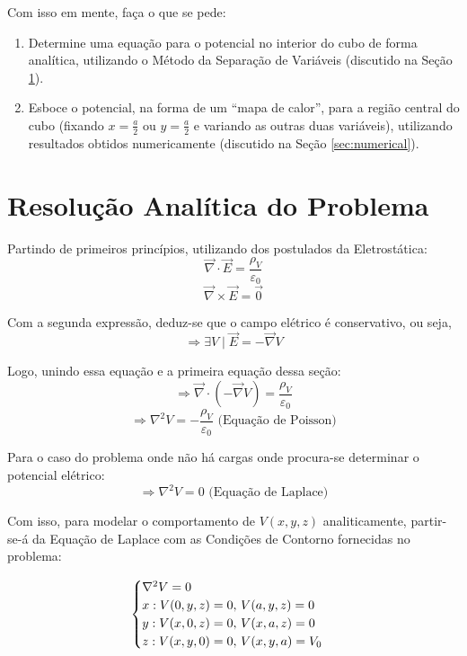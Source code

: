 \documentclass{report}
\let\oldsection\section
\renewcommand\section{\clearpage\oldsection}
\begin{document}
Com isso em mente, faça o que se pede:
\begin{enumerate}
    \item Determine uma equação para o potencial no interior do cubo de forma analítica, utilizando o Método da Separação de Variáveis
    (discutido na Seção \ref{sec:analysis}).
    \item Esboce o potencial, na forma de um ``mapa de calor”, para a região central do cubo (fixando $ x = \frac{a}{2} $
    ou $ y = \frac{a}{2} $ e variando as outras duas variáveis), utilizando resultados obtidos numericamente (discutido na Seção
    \ref{sec:numerical}).
\end{enumerate}

\section{Resolução Analítica do Problema}
\label{sec:analysis}

Partindo de primeiros princípios, utilizando dos postulados da Eletrostática:
$$ \overrightarrow{\nabla}\cdot \overrightarrow{E} = \frac{\rho_V}{\varepsilon_0} $$
$$ \overrightarrow{\nabla}\times \overrightarrow{E} = \overrightarrow{0} $$

Com a segunda expressão, deduz-se que o campo elétrico é conservativo, ou seja,
$$ \Rightarrow \exists V \mid \overrightarrow{E} = -\overrightarrow{\nabla} V $$

Logo, unindo essa equação e a primeira equação dessa seção:
$$ \Rightarrow \overrightarrow{\nabla}\cdot(-\overrightarrow{\nabla} V) = \frac{\rho_V}{\varepsilon_0} $$
$$ \Rightarrow \nabla^2V = -\frac{\rho_V}{\varepsilon_0} \text{ (Equação de Poisson)} $$

Para o caso do problema onde não há cargas onde procura-se determinar o potencial elétrico:
$$ \Rightarrow \nabla^2V = 0 \text{ (Equação de Laplace)} $$

Com isso, para modelar o comportamento de $ V(x, y, z) $ analiticamente, partir-se-á da Equação
de Laplace com as Condições de Contorno fornecidas no problema:

\begin{equation}
  \label{eq:laplace}
  \centering
  \begin{cases}
    \nabla^2 V = 0 \\
    x: V(0, y, z) = 0,\, V(a, y, z) = 0 \\
    y: V(x, 0, z) = 0,\, V(x, a, z) = 0 \\
    z: V(x, y, 0) = 0,\, V(x, y, a) = V_0
  \end{cases}
\end{equation}
\end{document}
